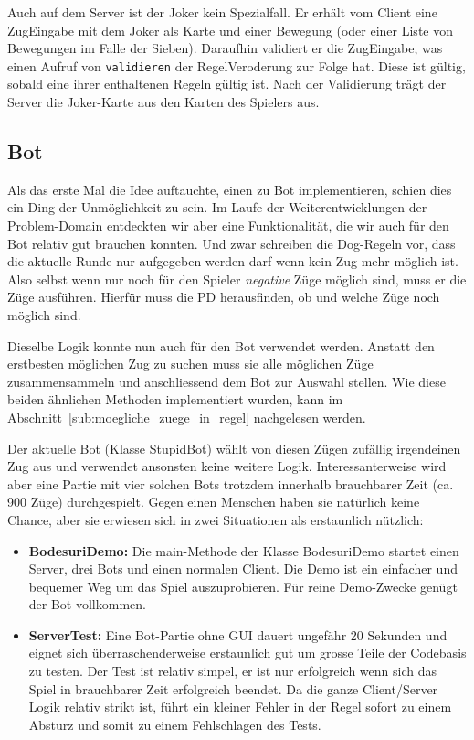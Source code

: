 \documentclass[12pt,halfparskip]{scrartcl}
\begin{document}
Auch auf dem Server ist der Joker kein Spezialfall. Er erhält vom Client eine ZugEingabe mit dem Joker als Karte und einer Bewegung (oder einer Liste von Bewegungen im Falle der Sieben). Daraufhin validiert er die ZugEingabe, was einen Aufruf von \texttt{validieren} der RegelVeroderung zur Folge hat. Diese ist gültig, sobald eine ihrer enthaltenen Regeln gültig ist. Nach der Validierung trägt der Server die Joker-Karte aus den Karten des Spielers aus.

\subsection{Bot}

Als das erste Mal die Idee auftauchte, einen zu Bot implementieren, schien dies ein Ding der Unmöglichkeit zu sein. Im Laufe der Weiterentwicklungen der Problem-Domain entdeckten wir aber eine Funktionalität, die wir auch für den Bot relativ gut brauchen konnten. Und zwar schreiben die Dog-Regeln vor, dass die aktuelle Runde nur aufgegeben werden darf wenn kein Zug mehr möglich ist. Also selbst wenn nur noch für den Spieler \emph{negative} Züge möglich sind, muss er die Züge ausführen. Hierfür muss die PD herausfinden, ob und welche Züge noch möglich sind.

Dieselbe Logik konnte nun auch für den Bot verwendet werden. Anstatt den erstbesten möglichen Zug zu suchen muss sie alle möglichen Züge zusammensammeln und anschliessend dem Bot zur Auswahl stellen. Wie diese beiden ähnlichen Methoden implementiert wurden, kann im Abschnitt~\vref{sub:moegliche_zuege_in_regel} nachgelesen werden.

Der aktuelle Bot (Klasse StupidBot) wählt von diesen Zügen zufällig irgendeinen Zug aus und verwendet ansonsten keine weitere Logik. Interessanterweise wird aber eine Partie mit vier solchen Bots trotzdem innerhalb brauchbarer Zeit (ca. 900 Züge) durchgespielt. Gegen einen Menschen haben sie natürlich keine Chance, aber sie erwiesen sich in zwei Situationen als erstaunlich nützlich:

\begin{itemize}
	\item \textbf{BodesuriDemo:} Die main-Methode der Klasse BodesuriDemo startet einen Server, drei Bots und einen normalen Client. Die Demo ist ein einfacher und bequemer Weg um das Spiel auszuprobieren. Für reine Demo-Zwecke genügt der Bot vollkommen.
	\item \textbf{ServerTest:} Eine Bot-Partie ohne GUI dauert ungefähr 20 Sekunden und eignet sich überraschenderweise erstaunlich gut um grosse Teile der Codebasis zu testen. Der Test ist relativ simpel, er ist nur erfolgreich wenn sich das Spiel in brauchbarer Zeit erfolgreich beendet. Da die ganze Client/Server Logik relativ strikt ist, führt ein kleiner Fehler in der Regel sofort zu einem Absturz und somit zu einem Fehlschlagen des Tests.
\end{itemize}

\clearpage
\listoffigures
\end{document}
